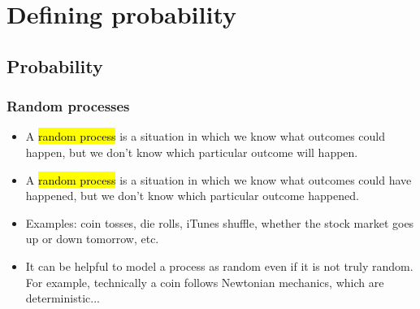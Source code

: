 
\section{Defining probability}


\subsection{Probability}










\begin{frame}
\frametitle{Random processes}

\begin{itemize}
\item A \hl{random process} is a situation in which we know what outcomes could happen, but we don't know which particular outcome will happen.
\pause
\item A \hl{random process} is a situation in which we know what outcomes could have happened, but we don't know which particular outcome happened.
\pause
\item Examples: coin tosses, die rolls, iTunes shuffle, whether the stock market goes up or down tomorrow, etc.

\item It can be helpful to model a process as random even if it is not truly random. For example, technically a coin follows Newtonian mechanics, which are deterministic... 

\end{itemize}

\end{frame}

